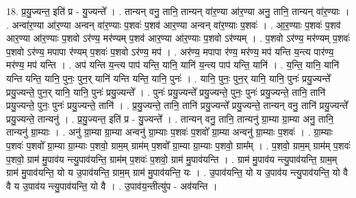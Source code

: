\documentclass[17pt]{extarticle}
\begin{document}
18. प्र॒यु॒ज्यन्त॒ इति॑ प्र - यु॒ज्यन्ते᳚ । . तान्यन् वनु॒ तानि॒ तान्यन् वा॑र॒ण्या आ॑र॒ण्या अनु॒ तानि॒ तान्यन् वा॑र॒ण्याः । . अन्वा॑र॒ण्या आ॑र॒ण्या अन्वन् वा॑र॒ण्याः प॒शवः॑ प॒शव॑ आर॒ण्या अन्वन् वा॑र॒ण्याः प॒शवः॑ । . आ॒र॒ण्याः प॒शवः॑ प॒शव॑ आर॒ण्या आ॑र॒ण्याः प॒शवो ऽर॑ण्य॒ मर॑ण्यम् प॒शव॑ आर॒ण्या आ॑र॒ण्याः प॒शवो ऽर॑ण्यम् । . प॒शवो ऽर॑ण्य॒ मर॑ण्यम् प॒शवः॑ प॒शवो ऽर॑ण्य॒ मपापा र॑ण्यम् प॒शवः॑ प॒शवो ऽर॑ण्य॒ मप॑ । . अर॑ण्य॒ मपापा र॑ण्य॒ मर॑ण्य॒ मप॑ यन्ति य॒न्त्य पार॑ण्य॒ मर॑ण्य॒ मप॑ यन्ति । . अप॑ यन्ति य॒न्त्य पाप॑ यन्ति॒ यानि॒ यानि॑ य॒न्त्य पाप॑ यन्ति॒ यानि॑ । . य॒न्ति॒ यानि॒ यानि॑ यन्ति यन्ति॒ यानि॒ पुनः॒ पुन॒र् यानि॑ यन्ति यन्ति॒ यानि॒ पुनः॑ । . यानि॒ पुनः॒ पुन॒र् यानि॒ यानि॒ पुनः॑ प्रयु॒ज्यन्ते᳚ प्रयु॒ज्यन्ते॒ पुन॒र् यानि॒ यानि॒ पुनः॑ प्रयु॒ज्यन्ते᳚ । . पुनः॑ प्रयु॒ज्यन्ते᳚ प्रयु॒ज्यन्ते॒ पुनः॒ पुनः॑ प्रयु॒ज्यन्ते॒ तानि॒ तानि॑ प्रयु॒ज्यन्ते॒ पुनः॒ पुनः॑ प्रयु॒ज्यन्ते॒ तानि॑ । . प्र॒यु॒ज्यन्ते॒ तानि॒ तानि॑ प्रयु॒ज्यन्ते᳚ प्रयु॒ज्यन्ते॒ तान्यन् वनु॒ तानि॑ प्रयु॒ज्यन्ते᳚ प्रयु॒ज्यन्ते॒ तान्यनु॑ । . प्र॒यु॒ज्यन्त॒ इति॑ प्र - यु॒ज्यन्ते᳚ । . तान्यन् वनु॒ तानि॒ तान्यनु॑ ग्रा॒म्या ग्रा॒म्या अनु॒ तानि॒ तान्यनु॑ ग्रा॒म्याः । . अनु॑ ग्रा॒म्या ग्रा॒म्या अन्वनु॑ ग्रा॒म्याः प॒शवः॑ प॒शवो᳚ ग्रा॒म्या अन्वनु॑ ग्रा॒म्याः प॒शवः॑ । . ग्रा॒म्याः प॒शवः॑ प॒शवो᳚ ग्रा॒म्या ग्रा॒म्याः प॒शवो॒ ग्राम॒म् ग्राम॑म् प॒शवो᳚ ग्रा॒म्या ग्रा॒म्याः प॒शवो॒ ग्राम᳚म् । . प॒शवो॒ ग्राम॒म् ग्राम॑म् प॒शवः॑ प॒शवो॒ ग्राम॑ मु॒पाव॑य न्त्यु॒पाव॑यन्ति॒ ग्राम॑म् प॒शवः॑ प॒शवो॒ ग्राम॑ मु॒पाव॑यन्ति । . ग्राम॑ मु॒पाव॑य न्त्यु॒पाव॑यन्ति॒ ग्राम॒म् ग्राम॑ मु॒पाव॑यन्ति॒ यो य उ॒पाव॑यन्ति॒ ग्राम॒म् ग्राम॑ मु॒पाव॑यन्ति॒ यः । . उ॒पाव॑यन्ति॒ यो य उ॒पाव॑य न्त्यु॒पाव॑यन्ति॒ यो वै वै य उ॒पाव॑य न्त्यु॒पाव॑यन्ति॒ यो वै । . उ॒पाव॑य॒न्तीत्यु॑प - अव॑यन्ति । \newline
\end{document}
